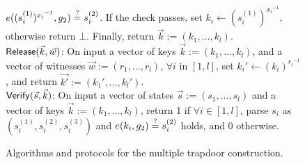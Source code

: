 \begin{figure*}[htb]
\begin{center}
{\begin{minipage}[t]{0.75\textwidth}
			$e((s_i^{(1)})^{{x_i}^{-1}}, g_2) \stackrel{?}{=} s_i^{(2)}$. If the check passes, set 
			$k_i \gets (s_i^{(1)})^{{x_i}^{-1}}$, otherwise return $\bot$. Finally, return $\vec{k} := 
			(k_1,\ldots,k_l)$. \\
			\underline{$\mathsf{Release}(\vec{k}, \vec{w})$}: On input a vector of keys $\vec{k} := (k_1,\ldots,k_l)$, 
			and a vector of witnesses $\vec{w} := (r_1,\ldots,r_l)$, $\forall i$ in $[1,l]$, set $k_i' \gets 
			(k_i)^{{r_i}^{-1}}$, and return $\vec{k'} := (k_1',\ldots,k_l')$. \\
			\underline{$\mathsf{Verify}(\vec{s}, \vec{k})$}: On input a vector of states $\vec{s} := (s_1,\ldots,
			s_l)$ and a vector of keys $\vec{k} := (k_1,\ldots,k_l)$, return 1 if $\forall i \in [1,l]$, 
			parse $s_i$ as $(s_i^{(1)}, s_i^{(2)}, s_i^{(3)})$ and $e(k_i, g_2) \stackrel{?}{=} s_i^{(2)}$ holds, and 
			0 otherwise.
		\end{minipage}
	}
	\end{center}
	
	\caption{Algorithms and protocols for the multiple trapdoor construction.}
	\label{fig:multi-trapdoor}
\end{figure*}
